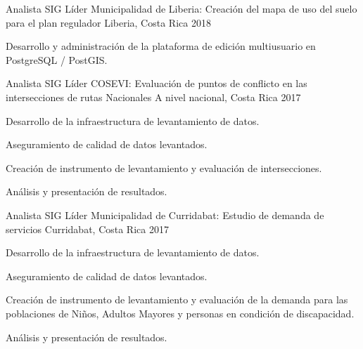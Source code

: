 \begin{cventries}
\cventry
{Analista SIG Líder} %
{Municipalidad de Liberia: Creación del mapa de uso del   suelo para el plan
  regulador} %
{Liberia, Costa Rica} %
{2018} %
{
  \begin{cvitems} %
    \item Desarrollo y administración de la plataforma de edición multiusuario
    en PostgreSQL / PostGIS.
  \end{cvitems}
}
\cventry
{Analista SIG Líder} %
{COSEVI: Evaluación de puntos de conflicto en las intersecciones de rutas
  Nacionales} %
{A nivel nacional, Costa Rica} %
{2017} %
{
  \begin{cvitems} %
    \item Desarrollo de la infraestructura de levantamiento de datos.
    \item Aseguramiento de calidad de datos levantados.
    \item Creación de instrumento de levantamiento y evaluación de
    intersecciones.
    \item Análisis y presentación de resultados.
  \end{cvitems}
}
\cventry
{Analista SIG Líder} %
{Municipalidad de Curridabat: Estudio de demanda de servicios} %
{Curridabat, Costa Rica} %
{2017} %
{
  \begin{cvitems} %
    \item Desarrollo de la infraestructura de levantamiento de datos.
    \item Aseguramiento de calidad de datos levantados.
    \item Creación de instrumento de levantamiento y evaluación de la
    demanda para las poblaciones de Niños, Adultos Mayores y personas en
    condición de discapacidad.
    \item Análisis y presentación de resultados.
  \end{cvitems}
}
\end{cventries}